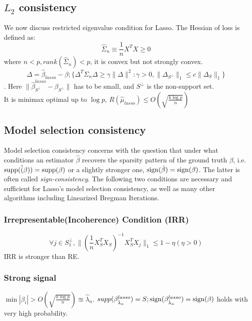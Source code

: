 \documentclass[twoside]{article}
\theoremstyle{definition}
\theoremstyle{definition}
\theoremstyle{remark}
\def\sign{{\rm sign}}
\def\supp{{\rm supp}}
\begin{document}
\subsection{$L_2$ consistency}
We now discuss restricted eigenvalue condition for Lasso. The Hessian of loss is defined as:
$$\hat\Sigma_n \equiv \frac{1}{n}X^TX \geq 0$$
where $n < p, rank(\hat\Sigma_n)<p$, it is convex but not strongly convex.
$$\Delta = \hat\beta_{lasso}-\beta; \{\Delta^T\Sigma_n\Delta \ge \gamma \| \Delta \|^2: \gamma > 0, \| \Delta_{S^\perp} \|_1\leq c\|\Delta_S\|_1 \}$$.
Here $\| \hat\beta_{S^\perp}^{lasso} - \beta_{S^\perp} \|$ has to be small, and $S^\perp$ is the non-support set.
\\
It is minimax optimal up to $\log p$, $R(\hat\mu_{lasso}) \le O(\sqrt{\frac{k\log p}{n}})$

\subsection{Model selection consistency}
Model selection consistency concerns with the question that under what conditions an estimator $\hat\beta$ recovers the sparsity pattern of the ground truth $\beta$, i.e. $\supp(\hat(\beta))=\supp(\beta)$ or a slightly stronger one, $\sign(\hat\beta)=\sign(\beta)$. The latter is often called \emph{sign-consistency}. The following two conditions are necessary and sufficient for Lasso's model selection consistency, as well as many other algorithms including Linearized Bregman Iterations.

\subsubsection{Irrepresentable(Incoherence) Condition (IRR)}
$$\forall j \in S_1^\perp, \| (\frac{1}{n}X_S^TX_S)^{-1}X_S^TX_j \|_1 \le 1-\eta (\eta>0)$$
IRR is stronger than RE.
\subsubsection{Strong signal}
$\min|\beta_i| > O(\sqrt{\frac{k\log p}{n}}) \approxeq \hat\lambda_n$.
$supp(\beta^{lasso}_{\hat\lambda_n}) = S; \sign(\beta^{lasso}_{\hat\lambda_n}) = \sign(\beta)$ holds with very high probability.
\end{document}
